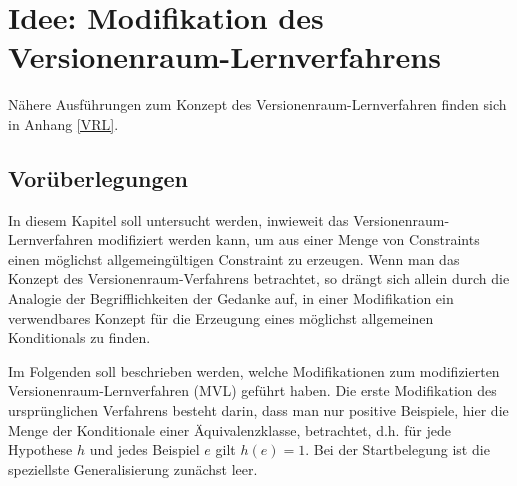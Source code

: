 \documentclass[draft]{scrreprt}
\begin{document}
	\section{Idee: Modifikation des Versionenraum-Lernverfahrens} \label{Verwendbar VRL}  
	Nähere Ausführungen zum Konzept des Versionenraum-Lernverfahren finden sich in Anhang \ref{VRL}.\\
	\subsection{Vorüberlegungen}
	In diesem Kapitel soll untersucht werden, inwieweit das Versionenraum-Lernverfahren modifiziert werden kann, um aus einer Menge von Constraints einen möglichst allgemeingültigen Constraint zu erzeugen. Wenn man das Konzept des Versionenraum-Verfahrens betrachtet, so drängt sich allein durch die Analogie der Begrifflichkeiten der Gedanke auf, in einer Modifikation ein verwendbares Konzept für die Erzeugung eines möglichst allgemeinen Konditionals zu finden.
	
	Im Folgenden soll beschrieben werden, welche Modifikationen zum modifizierten\\ Versionenraum-Lernverfahren (MVL)  geführt haben.
	Die erste Modifikation des ursprünglichen Verfahrens besteht darin, dass man nur positive Beispiele, hier die Menge der Konditionale einer Äquivalenzklasse, betrachtet, d.h. für jede Hypothese $ h $ und jedes Beispiel $ e $ gilt $ h(e) = 1 $.
	Bei der Startbelegung ist die speziellste Generalisierung zunächst leer. 
\end{document}
